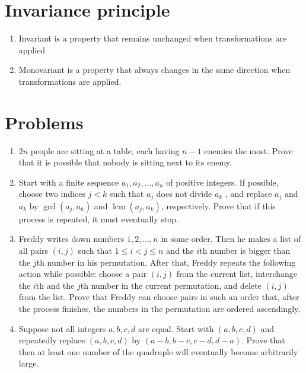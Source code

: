 \documentclass{article}
\DeclareMathOperator{\lcm}{lcm}
\begin{document}
	
\section*{Invariance principle}
\begin{enumerate}
	\item 
	Invariant is a property that remains unchanged when transformations are applied
	\item
	Monovariant is a property that always changes in the same direction when transformations are applied.

\end{enumerate}
	\section*{Problems}
	\begin{enumerate}
		\item %
		$2n$ people are sitting at a table, each having $n-1$ enemies the most. Prove that it is possible that nobody is sitting next to its enemy.
		\item %
		Start with a finite sequence $a_1, a_2,\dots, a_n$ of positive integers. If possible,
		choose two indices $j < k$ such that $a_j$ does not divide $a_k$ , and replace $a_j$
		and $a_k$ by $\gcd(a_j, a_k)$ and $\lcm (a_j, a_k )$, respectively. Prove that if this
		process is repeated, it must eventually stop.
		
		\item %
		Freddy writes down numbers $1, 2,\dots, n$ in some order. Then he makes a list of all pairs $(i, j)$ such that $1 \leq i < j \leq n$ and the $i$th number is bigger than the $j$th number in his permutation. After that, Freddy repeats the following action while possible: choose a pair $(i, j)$ from the current list, interchange the $i$th and the $j$th number in the current permutation, and delete $(i, j)$ from the list. Prove that Freddy can choose pairs in such an order that, after the process finishes, the numbers in the permutation are ordered ascendingly.
		
		\item 
		Suppose not all integers $a,b,c,d$ are equal. Start with $(a,b,c,d)$ and repeatedly replace $(a,b,c,d)$ by $(a-b,b-c,c-d,d-a)$. Prove that then at least one number of the quadruple will eventually become arbitrarily large.
		

\end{enumerate}
\end{document}
